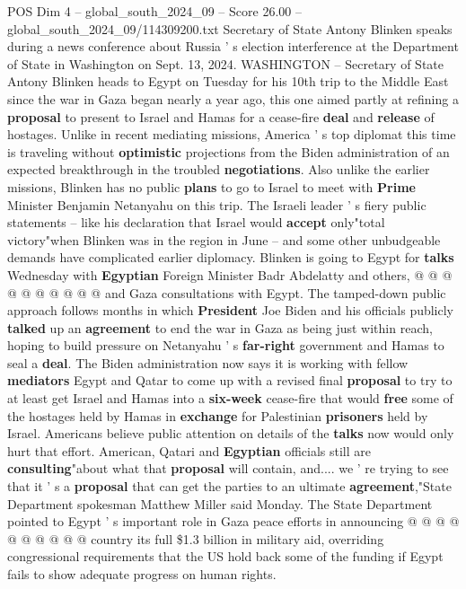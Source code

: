 \begin{textsample}{POS Dim 4 – global\_south\_2024\_09 – Score 26.00 – global\_south\_2024\_09/114309200.txt}  \label{ex:f4_pos_273}
Secretary of State Antony Blinken speaks during a news conference about Russia ' s election interference at the Department of State in Washington on Sept. 13, 2024.
WASHINGTON -- Secretary of State Antony Blinken heads to Egypt on Tuesday for his 10th trip to the Middle East since the war in Gaza began nearly a year ago, this one aimed partly at refining a \textbf{proposal} to present to Israel and Hamas for a cease-fire \textbf{deal} and \textbf{release} of hostages.
Unlike in recent mediating missions, America ' s top diplomat this time is traveling without \textbf{optimistic} projections from the Biden administration of an expected breakthrough in the troubled \textbf{negotiations}.
Also unlike the earlier missions, Blinken has no public \textbf{plans} to go to Israel to meet with \textbf{Prime} Minister Benjamin Netanyahu on this trip.
The Israeli leader ' s fiery public statements -- like his declaration that Israel would \textbf{accept} only"total victory"when Blinken was in the region in June -- and some other unbudgeable demands have complicated earlier diplomacy.
Blinken is going to Egypt for \textbf{talks} Wednesday with \textbf{Egyptian} Foreign Minister Badr Abdelatty and others, @ @ @ @ @ @ @ @ @ @ and Gaza consultations with Egypt.
The tamped-down public approach follows months in which \textbf{President} Joe Biden and his officials publicly \textbf{talked} up an \textbf{agreement} to end the war in Gaza as being just within reach, hoping to build pressure on Netanyahu ' s \textbf{far-right} government and Hamas to seal a \textbf{deal}.
The Biden administration now says it is working with fellow \textbf{mediators} Egypt and Qatar to come up with a revised final \textbf{proposal} to try to at least get Israel and Hamas into a \textbf{six-week} cease-fire that would \textbf{free} some of the hostages held by Hamas in \textbf{exchange} for Palestinian \textbf{prisoners} held by Israel.
Americans believe public attention on details of the \textbf{talks} now would only hurt that effort.
American, Qatari and \textbf{Egyptian} officials still are \textbf{consulting}"about what that \textbf{proposal} will contain, and.... we ' re trying to see that it ' s a \textbf{proposal} that can get the parties to an ultimate \textbf{agreement},"State Department spokesman Matthew Miller said Monday.
The State Department pointed to Egypt ' s important role in Gaza peace efforts in announcing @ @ @ @ @ @ @ @ @ @ country its full \$1.3 billion in military aid, overriding congressional requirements that the US hold back some of the funding if Egypt fails to show adequate progress on human rights.

\end{textsample}
